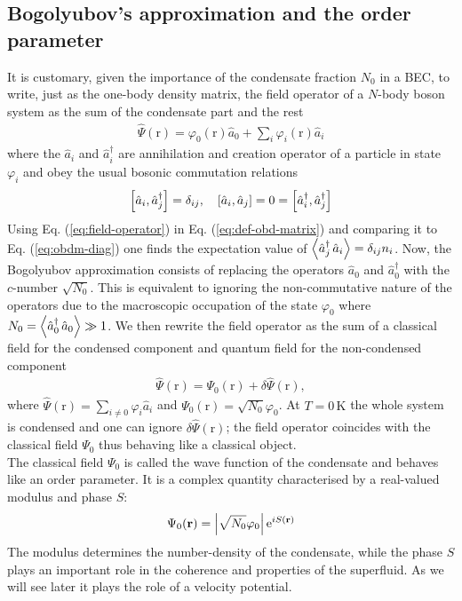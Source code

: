 \documentclass[11pt,a4paper,twoside]{article}
\renewcommand{\vec}[1]{\bm{\mathrm{#1}}}
\newcommand{\unit}[1]{\,\mathrm{#1}}
\begin{document}
		\subsection{Bogolyubov's approximation and the order parameter}
			It is customary, given the importance of the condensate fraction $N_0$ in a BEC, to write, just as the one-body density matrix, the field operator of a $N$-body boson system as the sum of the condensate part and the rest
			\begin{align}
				\hat{\Psi}(\vec{r})=\varphi_0(\vec{r})\hat{a}_0 + \sum_i \varphi_i(\vec{r})\hat{a}_i \label{eq:field-operator}
			\end{align}
			where the $\hat{a}_i$ and $\hat{a}_i^\dagger$ are annihilation and creation operator of a particle in state $\varphi_i$ and obey the usual bosonic commutation relations
			\begin{align}
				\commutator{\hat{a}_i}{\hat{a}_j^\dagger}=\delta_{ij},\quad 	\commutator{\hat{a}_i}{\hat{a}_j}=0=\commutator{\hat{a}_i^\dagger}{\hat{a}_j^\dagger}
			\end{align}
			Using Eq. (\ref{eq:field-operator}) in Eq. (\ref{eq:def-obd-matrix}) and comparing it to Eq. (\ref{eq:obdm-diag}) one finds the expectation value of $\expectationvalue{\hat{a}_j^\dagger\,\hat{a}_i}=\delta_{ij}n_i$. Now, the Bogolyubov approximation consists of replacing the operators $\hat{a}_0$ and $\hat{a}_0^\dagger$ with the $c$-number $\sqrt{N_0}$. This is equivalent to ignoring the non-commutative nature of the operators due to the macroscopic occupation of the state $\varphi_0$ where $N_0=\expectationvalue{\hat{a}_0^\dagger\,\hat{a}_0}\gg 1$. We then rewrite the field operator as the sum of a classical field for the condensed component and quantum field for the non-condensed component
			\begin{align}
				\hat{\Psi}(\vec{r})=\Psi_0(\vec{r})+\delta\hat{\Psi}(\vec{r}),
			\end{align}
			where $\hat{\Psi}(\vec{r})=\sum_{i\neq 0}\varphi_i\hat{a}_i$ and $\Psi_0(\vec{r})=\sqrt{N_0}\varphi_0$. At $T=0\unit{K}$ the whole system is condensed and one can ignore $\delta\hat{\Psi}(\vec{r})$; the field operator coincides with the classical field $\Psi_0$ thus behaving like a classical object.\\
			
			The classical field $\Psi_0$ is called the wave function of the condensate and behaves like an order parameter. It is a complex quantity characterised by a real-valued modulus and phase $S$:
			\begin{align}
				\Psi_0(\vec{r}) = \absolutevalue{\sqrt{N_0}\varphi_0}\,\mathrm{e}^{iS(\vec{r})}
			\end{align}
			The modulus determines the number-density of the condensate, while the phase $S$ plays an important role in the coherence and properties of the superfluid. As we will see later it plays the role of a velocity potential.\\
			
\end{document}
